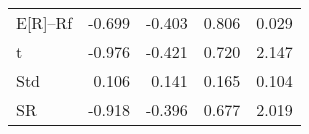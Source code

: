 \begin{tabular}{lrrrr}
\toprule
\midrule
E[R]--Rf & -0.699 & -0.403 & 0.806 & 0.029 \\
t & -0.976 & -0.421 & 0.720 & 2.147 \\
Std & 0.106 & 0.141 & 0.165 & 0.104 \\
SR & -0.918 & -0.396 & 0.677 & 2.019 \\
\bottomrule
\end{tabular}
